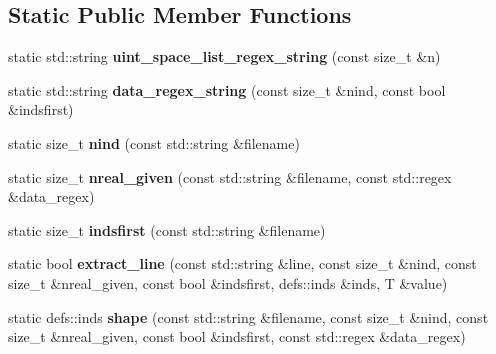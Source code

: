 \subsection*{Static Public Member Functions}
\begin{DoxyCompactItemize}
\item 
static std\+::string {\bfseries uint\+\_\+space\+\_\+list\+\_\+regex\+\_\+string} (const size\+\_\+t \&n)\hypertarget{classTensorFileIterator_aa369a2ba6106dd3542e2621738da6cf1}{}\label{classTensorFileIterator_aa369a2ba6106dd3542e2621738da6cf1}

\item 
static std\+::string {\bfseries data\+\_\+regex\+\_\+string} (const size\+\_\+t \&nind, const bool \&indsfirst)\hypertarget{classTensorFileIterator_a63fc7eec45cbe6a123d2412c0953d5f8}{}\label{classTensorFileIterator_a63fc7eec45cbe6a123d2412c0953d5f8}

\item 
static size\+\_\+t {\bfseries nind} (const std\+::string \&filename)\hypertarget{classTensorFileIterator_a283ec3c802c280dd834a92a5477faf62}{}\label{classTensorFileIterator_a283ec3c802c280dd834a92a5477faf62}

\item 
static size\+\_\+t {\bfseries nreal\+\_\+given} (const std\+::string \&filename, const std\+::regex \&data\+\_\+regex)\hypertarget{classTensorFileIterator_a8f197acca49bcd9160041b17670891fe}{}\label{classTensorFileIterator_a8f197acca49bcd9160041b17670891fe}

\item 
static size\+\_\+t {\bfseries indsfirst} (const std\+::string \&filename)\hypertarget{classTensorFileIterator_a213c8deadd21886441f875c84db3ad7d}{}\label{classTensorFileIterator_a213c8deadd21886441f875c84db3ad7d}

\item 
static bool {\bfseries extract\+\_\+line} (const std\+::string \&line, const size\+\_\+t \&nind, const size\+\_\+t \&nreal\+\_\+given, const bool \&indsfirst, defs\+::inds \&inds, T \&value)\hypertarget{classTensorFileIterator_a926cb9a218a1a349465029a4679e756c}{}\label{classTensorFileIterator_a926cb9a218a1a349465029a4679e756c}

\item 
static defs\+::inds {\bfseries shape} (const std\+::string \&filename, const size\+\_\+t \&nind, const size\+\_\+t \&nreal\+\_\+given, const bool \&indsfirst, const std\+::regex \&data\+\_\+regex)\hypertarget{classTensorFileIterator_a9f9d9aac50dc525bbc76b521b875c30b}{}\label{classTensorFileIterator_a9f9d9aac50dc525bbc76b521b875c30b}

\end{DoxyCompactItemize}
